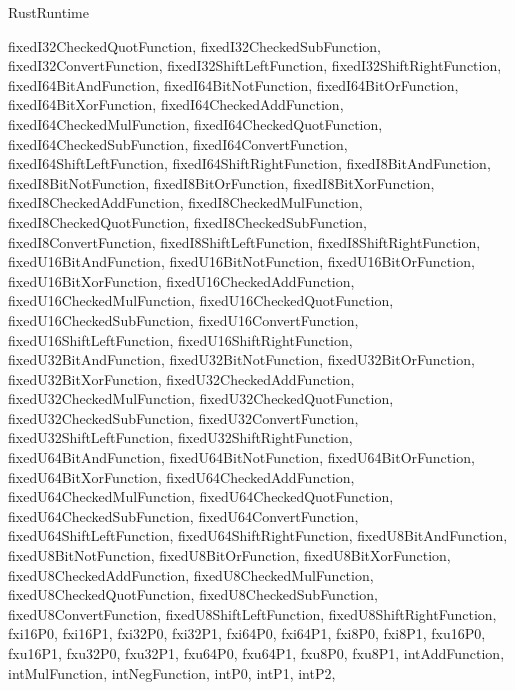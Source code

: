 \begin{lexlean}{RustRuntime}
\begin{semanticmodule}
{{      fixedI32CheckedQuotFunction,
      fixedI32CheckedSubFunction,
      fixedI32ConvertFunction,
      fixedI32ShiftLeftFunction,
      fixedI32ShiftRightFunction,
      fixedI64BitAndFunction,
      fixedI64BitNotFunction,
      fixedI64BitOrFunction,
      fixedI64BitXorFunction,
      fixedI64CheckedAddFunction,
      fixedI64CheckedMulFunction,
      fixedI64CheckedQuotFunction,
      fixedI64CheckedSubFunction,
      fixedI64ConvertFunction,
      fixedI64ShiftLeftFunction,
      fixedI64ShiftRightFunction,
      fixedI8BitAndFunction,
      fixedI8BitNotFunction,
      fixedI8BitOrFunction,
      fixedI8BitXorFunction,
      fixedI8CheckedAddFunction,
      fixedI8CheckedMulFunction,
      fixedI8CheckedQuotFunction,
      fixedI8CheckedSubFunction,
      fixedI8ConvertFunction,
      fixedI8ShiftLeftFunction,
      fixedI8ShiftRightFunction,
      fixedU16BitAndFunction,
      fixedU16BitNotFunction,
      fixedU16BitOrFunction,
      fixedU16BitXorFunction,
      fixedU16CheckedAddFunction,
      fixedU16CheckedMulFunction,
      fixedU16CheckedQuotFunction,
      fixedU16CheckedSubFunction,
      fixedU16ConvertFunction,
      fixedU16ShiftLeftFunction,
      fixedU16ShiftRightFunction,
      fixedU32BitAndFunction,
      fixedU32BitNotFunction,
      fixedU32BitOrFunction,
      fixedU32BitXorFunction,
      fixedU32CheckedAddFunction,
      fixedU32CheckedMulFunction,
      fixedU32CheckedQuotFunction,
      fixedU32CheckedSubFunction,
      fixedU32ConvertFunction,
      fixedU32ShiftLeftFunction,
      fixedU32ShiftRightFunction,
      fixedU64BitAndFunction,
      fixedU64BitNotFunction,
      fixedU64BitOrFunction,
      fixedU64BitXorFunction,
      fixedU64CheckedAddFunction,
      fixedU64CheckedMulFunction,
      fixedU64CheckedQuotFunction,
      fixedU64CheckedSubFunction,
      fixedU64ConvertFunction,
      fixedU64ShiftLeftFunction,
      fixedU64ShiftRightFunction,
      fixedU8BitAndFunction,
      fixedU8BitNotFunction,
      fixedU8BitOrFunction,
      fixedU8BitXorFunction,
      fixedU8CheckedAddFunction,
      fixedU8CheckedMulFunction,
      fixedU8CheckedQuotFunction,
      fixedU8CheckedSubFunction,
      fixedU8ConvertFunction,
      fixedU8ShiftLeftFunction,
      fixedU8ShiftRightFunction,
      fxi16P0,
      fxi16P1,
      fxi32P0,
      fxi32P1,
      fxi64P0,
      fxi64P1,
      fxi8P0,
      fxi8P1,
      fxu16P0,
      fxu16P1,
      fxu32P0,
      fxu32P1,
      fxu64P0,
      fxu64P1,
      fxu8P0,
      fxu8P1,
      intAddFunction,
      intMulFunction,
      intNegFunction,
      intP0,
      intP1,
      intP2,
}}
\end{semanticmodule}
\end{lexlean}
